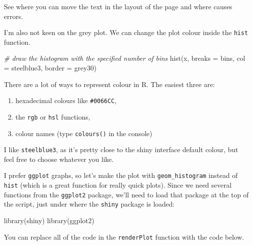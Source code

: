 \documentclass[
]{book}
\newenvironment{Shaded}{\begin{snugshade}}{\end{snugshade}}
\newcommand{\AttributeTok}[1]{\textcolor[rgb]{0.77,0.63,0.00}{#1}}
\newcommand{\CommentTok}[1]{\textcolor[rgb]{0.56,0.35,0.01}{\textit{#1}}}
\newcommand{\FunctionTok}[1]{\textcolor[rgb]{0.00,0.00,0.00}{#1}}
\newcommand{\NormalTok}[1]{#1}
\newcommand{\StringTok}[1]{\textcolor[rgb]{0.31,0.60,0.02}{#1}}
\providecommand{\tightlist}{%
  \setlength{\itemsep}{0pt}\setlength{\parskip}{0pt}}
\begin{document}
See where you can move the text in the layout of the page and where causes errors.

I'm also not keen on the grey plot. We can change the plot colour inside the \texttt{hist} function.

\begin{Shaded}
\begin{Highlighting}[]
      \CommentTok{\# draw the histogram with the specified number of bins}
      \FunctionTok{hist}\NormalTok{(x, }\AttributeTok{breaks =}\NormalTok{ bins, }\AttributeTok{col =} \StringTok{\textquotesingle{}steelblue3\textquotesingle{}}\NormalTok{, }\AttributeTok{border =} \StringTok{\textquotesingle{}grey30\textquotesingle{}}\NormalTok{)}
\end{Highlighting}
\end{Shaded}

There are a lot of ways to represent colour in R. The easiest three are:

\begin{enumerate}
\def\labelenumi{\arabic{enumi}.}
\tightlist
\item
  hexadecimal colours like \texttt{\#0066CC},
\item
  the \texttt{rgb} or \texttt{hsl} functions,
\item
  colour names (type \texttt{colours()} in the console)
\end{enumerate}

I like \texttt{steelblue3}, as it's pretty close to the shiny interface default colour, but feel free to choose whatever you like.

I prefer \texttt{ggplot} graphs, so let's make the plot with \texttt{geom\_histogram} instead of \texttt{hist} (which is a great function for really quick plots). Since we need several functions from the \texttt{ggplot2} package, we'll need to load that package at the top of the script, just under where the \texttt{shiny} package is loaded:

\begin{Shaded}
\begin{Highlighting}[]
\FunctionTok{library}\NormalTok{(shiny)}
\FunctionTok{library}\NormalTok{(ggplot2)}
\end{Highlighting}
\end{Shaded}

You can replace all of the code in the \texttt{renderPlot} function with the code below.
\end{document}
